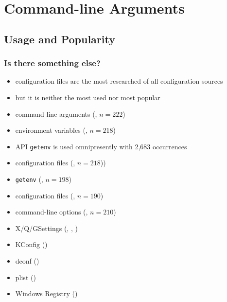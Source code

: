 \documentclass{beamer}
\begin{document}
\section{Command-line Arguments}

\subsection{Usage and Popularity}

\begin{frame}
	\frametitle{Is there something else?}
	\begin{itemize}
	\item configuration files are the most researched of all configuration sources~\cite{jin2014configurations}
	\item but it is neither the most used nor most popular~\cite{raab2017challenges}
	\end{itemize}
\end{frame}

\begin{frame}
	\methodQuestion{} 
	\begin{itemize}
	\item command-line arguments (, $n=222$)
	\item environment variables (, $n=218$)
	\item \methodSource{} API \texttt{getenv} is used omnipresently with 2,683 occurrences
	\item configuration files (, $n=218$))
	\end{itemize}
\end{frame}


\begin{frame}
	\methodQuestion{} 
	\begin{itemize}
	\item \texttt{getenv} (, $n=198$)
	\item configuration files (, $n=190$)
	\item command-line options (, $n=210$)
	\item X/Q/GSettings (, , )
	\item KConfig ()
	\item dconf ()
	\item plist ()
	\item Windows Registry ()
	\end{itemize}
\end{frame}
\end{document}
